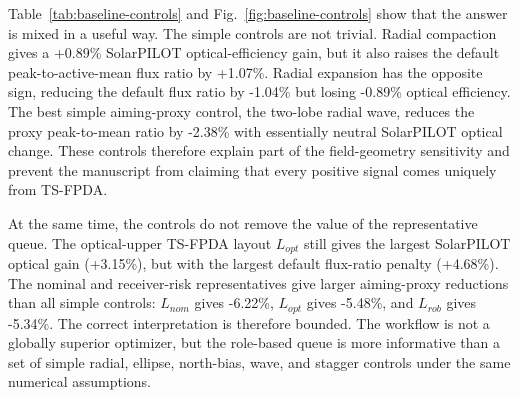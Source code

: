 \documentclass[final,3p,times]{elsarticle}
\begin{document}
Table~\ref{tab:baseline-controls} and Fig.~\ref{fig:baseline-controls} show that the answer is mixed in a useful way. The simple controls are not trivial. Radial compaction gives a +0.89\% SolarPILOT optical-efficiency gain, but it also raises the default peak-to-active-mean flux ratio by +1.07\%. Radial expansion has the opposite sign, reducing the default flux ratio by -1.04\% but losing -0.89\% optical efficiency. The best simple aiming-proxy control, the two-lobe radial wave, reduces the proxy peak-to-mean ratio by -2.38\% with essentially neutral SolarPILOT optical change. These controls therefore explain part of the field-geometry sensitivity and prevent the manuscript from claiming that every positive signal comes uniquely from TS-FPDA.

At the same time, the controls do not remove the value of the representative queue. The optical-upper TS-FPDA layout $L_{opt}$ still gives the largest SolarPILOT optical gain (+3.15\%), but with the largest default flux-ratio penalty (+4.68\%). The nominal and receiver-risk representatives give larger aiming-proxy reductions than all simple controls: $L_{nom}$ gives -6.22\%, $L_{opt}$ gives -5.48\%, and $L_{rob}$ gives -5.34\%. The correct interpretation is therefore bounded. The workflow is not a globally superior optimizer, but the role-based queue is more informative than a set of simple radial, ellipse, north-bias, wave, and stagger controls under the same numerical assumptions.
\end{document}

